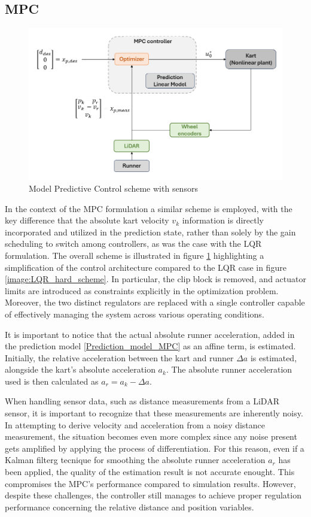 \documentclass[a4paper,12pt,oneside]{book}
\begin{document}
\subsection*{MPC}
\begin{figure}[h!]
	\centering
	\includegraphics[width=1.0\textwidth]{MPC_hard_scheme.png}
	\caption{Model Predictive Control scheme with sensors}
	\label{image:MPC_hard_scheme}
\end{figure}

In the context of the MPC formulation a similar scheme is employed, with the key difference that the absolute kart velocity $v_k$ information is directly incorporated and utilized in the prediction state, rather than solely by the gain scheduling to switch among controllers, as was the case with the LQR formulation.
The overall scheme is illustrated in figure \ref{image:MPC_hard_scheme} highlighting a simplification of the control architecture compared to the LQR case in figure \ref{image:LQR_hard_scheme}.
In particular, the clip block is removed, and actuator limits are introduced as constraints explicitly in the optimization problem.
Moreover, the two distinct regulators are replaced with a single controller capable of effectively managing the system across various operating conditions.

\bigskip
It is important to notice that the actual absolute runner acceleration, added in the prediction model  \eqref{Prediction_model_MPC} as an affine term, is estimated. 
Initially, the relative acceleration between the kart and runner $\Delta a$ is estimated, alongside the kart's absolute acceleration $a_k$.
The absolute runner acceleration used is then calculated as $a_r = a_k - \Delta a$.

\bigskip
When handling sensor data, such as distance measurements from a LiDAR sensor, it is important to recognize that these measurements are inherently noisy.
In attempting to derive velocity and acceleration from a noisy distance measurement, the situation becomes even more complex since any noise present gets amplified by applying the process of differentiation.
For this reason, even if a Kalman filterg tecnique for smoothing the absolute runner acceleration $a_r$ has been applied, the quality of the estimation result is not accurate enought.
This compromises the MPC's performance compared to simulation results. 
However, despite these challenges, the controller still manages to achieve proper regulation performance concerning the relative distance and position variables.
\end{document}
